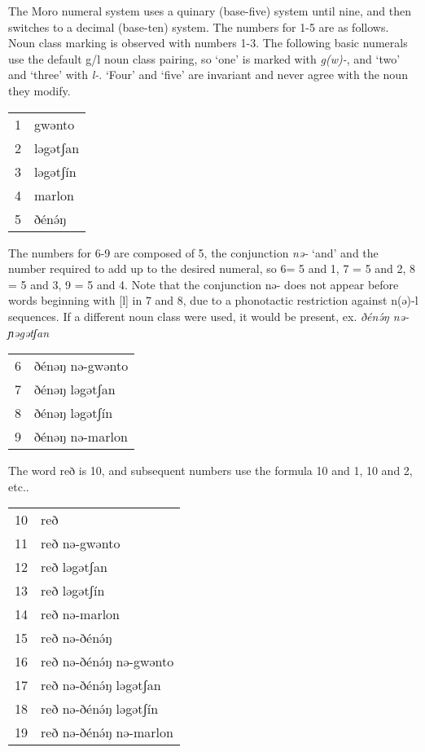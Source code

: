 The Moro numeral system uses a quinary (base-five) system until nine, and then switches to a decimal (base-ten) system. The numbers for 1-5 are as follows. Noun class marking is observed with numbers 1-3. The following basic numerals use the default g/l noun class pairing, so `one' is marked with \textit{g(w)-}, and `two' and `three' with \textit{l-}. `Four' and `five' are invariant and never agree with the noun they modify.

\ea \begin{tabular}[t]{ll}
1&	gwənto \\ 
2&	ləgətʃan \\ 
3&	ləgətʃín \\
4&	marlon \\
5&	ðénə́ŋ \\
 \end{tabular}
\z

The numbers for 6-9 are composed of 5, the conjunction \textit{nə-} ‘and’ and the number required to add up to the desired numeral, so 6= 5 and 1, 7 = 5 and 2, 8 = 5 and 3, 9 =  5 and 4. Note that the conjunction nə- does not appear before words beginning with [l] in 7 and 8, due to a phonotactic restriction against n(ə)-l sequences. If a different noun class were used, it would be present, ex. \textit{ðénə́ŋ nə-ɲəgətʃan}

\ea \begin{tabular}[t]{ll}
6 &	ðénəŋ nə-gwənto \\
7 &	ðénəŋ ləgətʃan \\ 
8 &	ðénəŋ ləgətʃín\\ 
9 &	ðénəŋ nə-marlon\\
  \end{tabular}
\z

The word reð is 10, and subsequent numbers use the formula 10 and 1, 10 and 2, etc.. 

\ea \begin{tabular}[t]{ll}
10 & reð\\
11 & reð nə-gwənto\\
12 & reð ləgətʃan\\
13 & reð ləgətʃín\\
14 & reð nə-marlon\\
15 & reð nə-ðénə́ŋ\\
16 & reð nə-ðénə́ŋ nə-gwənto  \\
17 & reð nə-ðénə́ŋ ləgətʃan\\
18 & reð nə-ðénə́ŋ ləgətʃín  \\
19 & reð nə-ðénə́ŋ nə-marlon  \\
   \end{tabular}
\z
	
